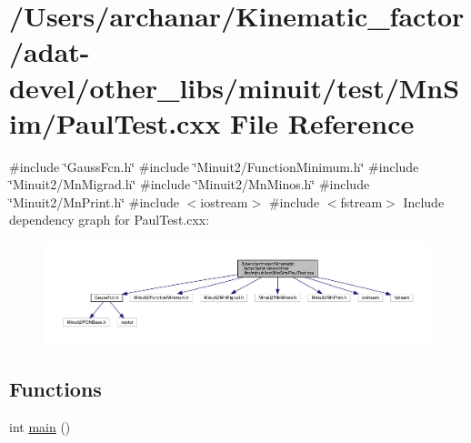 \hypertarget{adat-devel_2other__libs_2minuit_2test_2MnSim_2PaulTest_8cxx}{}\section{/\+Users/archanar/\+Kinematic\+\_\+factor/adat-\/devel/other\+\_\+libs/minuit/test/\+Mn\+Sim/\+Paul\+Test.cxx File Reference}
\label{adat-devel_2other__libs_2minuit_2test_2MnSim_2PaulTest_8cxx}
{\ttfamily \#include \char`\"{}Gauss\+Fcn.\+h\char`\"{}}\newline
{\ttfamily \#include \char`\"{}Minuit2/\+Function\+Minimum.\+h\char`\"{}}\newline
{\ttfamily \#include \char`\"{}Minuit2/\+Mn\+Migrad.\+h\char`\"{}}\newline
{\ttfamily \#include \char`\"{}Minuit2/\+Mn\+Minos.\+h\char`\"{}}\newline
{\ttfamily \#include \char`\"{}Minuit2/\+Mn\+Print.\+h\char`\"{}}\newline
{\ttfamily \#include $<$iostream$>$}\newline
{\ttfamily \#include $<$fstream$>$}\newline
Include dependency graph for Paul\+Test.\+cxx\+:
\nopagebreak
\begin{figure}[H]
\begin{center}
\leavevmode
\includegraphics[width=350pt]{d6/d18/adat-devel_2other__libs_2minuit_2test_2MnSim_2PaulTest_8cxx__incl}
\end{center}
\end{figure}
\subsection*{Functions}
\begin{DoxyCompactItemize}
\item 
int \mbox{\hyperlink{adat-devel_2other__libs_2minuit_2test_2MnSim_2PaulTest_8cxx_ae66f6b31b5ad750f1fe042a706a4e3d4}{main}} ()
\end{DoxyCompactItemize}


